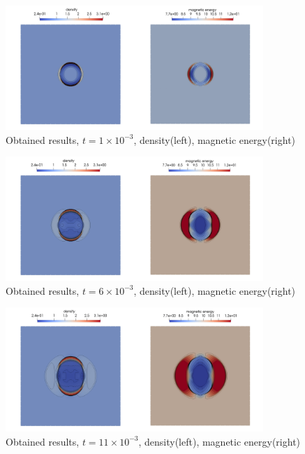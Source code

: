 \vspace{-5mm}
\begin{figure}[H]
	\begin{center}
		\includegraphics[width=0.87\textwidth]{img/mhd-blast/old/mynew1.jpg}
	\caption{Obtained results, $t = 1\times 10^{-3}$, density(left), magnetic energy(right)}
	\label{figure:blastOldMy1}
	\end{center}
\end{figure}
\vspace{-8mm}

\begin{figure}[H]
	\begin{center}
		\includegraphics[width=0.87\textwidth]{img/mhd-blast/old/mynew2.jpg}
	\caption{Obtained results, $t = 6\times 10^{-3}$, density(left), magnetic energy(right)}
	\label{figure:blastOldMy2}
	\end{center}
\end{figure}
\vspace{-8mm}

\begin{figure}[H]
	\begin{center}
		\includegraphics[width=0.87\textwidth]{img/mhd-blast/old/mynew3.jpg}
	\caption{Obtained results, $t = 11\times 10^{-3}$, density(left), magnetic energy(right)}
	\label{figure:blastOldMy3}
	\end{center}
\end{figure}
\vspace{-8mm}


